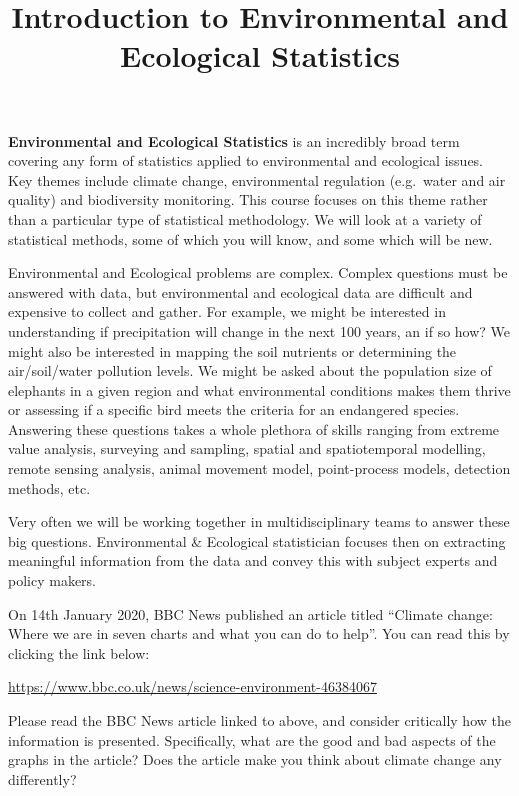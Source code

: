 \documentclass[
  letterpaper,
  DIV=11,
  numbers=noendperiod]{scrartcl}
\title{Introduction to Environmental and Ecological Statistics}
\author{}
\date{}
\makeatletter
\renewcommand{\maketitle}{\bgroup\setlength{\parindent}{0pt}
\begin{flushleft}
  {\color{uniblue}\sffamily\huge\textbf{\@title}} \vspace{0.3cm} \newline
  {\Large {\@subtitle}} \newline
  \@author
\end{flushleft}\egroup
}
\makeatother
\begin{document}
\maketitle

\pagestyle{mystyle}


\textbf{Environmental and Ecological Statistics} is an incredibly broad
term covering any form of statistics applied to environmental and
ecological issues. Key themes include climate change, environmental
regulation (e.g.~water and air quality) and biodiversity monitoring.
This course focuses on this theme rather than a particular type of
statistical methodology. We will look at a variety of statistical
methods, some of which you will know, and some which will be new.

Environmental and Ecological problems are complex. Complex questions
must be answered with data, but environmental and ecological data are
difficult and expensive to collect and gather. For example, we might be
interested in understanding if precipitation will change in the next 100
years, an if so how? We might also be interested in mapping the soil
nutrients or determining the air/soil/water pollution levels. We might
be asked about the population size of elephants in a given region and
what environmental conditions makes them thrive or assessing if a
specific bird meets the criteria for an endangered species. Answering
these questions takes a whole plethora of skills ranging from extreme
value analysis, surveying and sampling, spatial and spatiotemporal
modelling, remote sensing analysis, animal movement model, point-process
models, detection methods, etc.

Very often we will be working together in multidisciplinary teams to
answer these big questions. Environmental \& Ecological statistician
focuses then on extracting meaningful information from the data and
convey this with subject experts and policy makers.

\begin{tcolorbox}[enhanced jigsaw, left=2mm, toprule=.15mm, rightrule=.15mm, coltitle=black, arc=.35mm, colframe=quarto-callout-note-color-frame, breakable, bottomtitle=1mm, colback=white, titlerule=0mm, toptitle=1mm, title={BBC News article on climate change}, bottomrule=.15mm, colbacktitle=quarto-callout-note-color!10!white, opacitybacktitle=0.6, opacityback=0, leftrule=.75mm]

On 14th January 2020, BBC News published an article titled ``Climate
change: Where we are in seven charts and what you can do to help''. You
can read this by clicking the link below:

\url{https://www.bbc.co.uk/news/science-environment-46384067}

Please read the BBC News article linked to above, and consider
critically how the information is presented. Specifically, what are the
good and bad aspects of the graphs in the article? Does the article make
you think about climate change any differently?

\end{tcolorbox}
\end{document}
